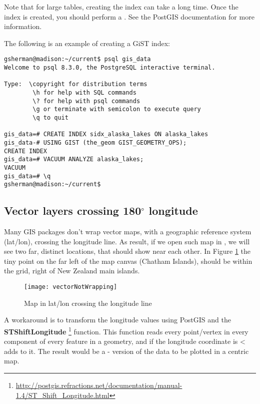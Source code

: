 Note that for large tables, creating the index can take a long time. Once the
index is created, you should perform a . See the
PostGIS documentation \cite{PostGISweb} for more information.

The following is an example of creating a GiST index:
\begin{verbatim}
gsherman@madison:~/current$ psql gis_data
Welcome to psql 8.3.0, the PostgreSQL interactive terminal.

Type:  \copyright for distribution terms
        \h for help with SQL commands
        \? for help with psql commands
        \g or terminate with semicolon to execute query
        \q to quit

gis_data=# CREATE INDEX sidx_alaska_lakes ON alaska_lakes
gis_data-# USING GIST (the_geom GIST_GEOMETRY_OPS);
CREATE INDEX
gis_data=# VACUUM ANALYZE alaska_lakes;
VACUUM
gis_data=# \q
gsherman@madison:~/current$
\end{verbatim}

\subsection{Vector layers crossing 180$^\circ$ longitude}

Many GIS packages don't wrap vector maps, with a geographic reference system
(lat/lon), crossing the  longitude line. As result, if
we open such map in \qg, we will see two far, distinct locations, that
should show near each other. In Figure \ref{fig:vector_not_wrapping} the tiny
point on the far left of the map canvas (Chatham Islands), should be within
the grid, right of New Zealand main islands.

\begin{figure}[ht]
   \centering
   \texttt{[image: vectorNotWrapping]}
      \caption{Map in lat/lon crossing the  longitude line \nixcaption}
   \label{fig:vector_not_wrapping}
\end{figure}

A workaround is to transform the longitude values using PostGIS and the
\textbf{ST\textunderscore Shift\textunderscore Longitude}
\footnote{\url{http://postgis.refractions.net/documentation/manual-1.4/ST\_Shift\_Longitude.html}}
function. This function reads every point/vertex in every component of every
feature in a geometry, and if the longitude coordinate is <  adds
 to it. The result would be a  -  version of
the data to be plotted in a  centric map.

